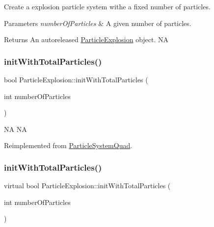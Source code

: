 Create a explosion particle system withe a fixed number of particles.


\begin{DoxyParams}{Parameters}
{\em number\+Of\+Particles} & A given number of particles. \\
\hline
\end{DoxyParams}
\begin{DoxyReturn}{Returns}
An autoreleased \hyperlink{classParticleExplosion}{Particle\+Explosion} object.  NA 
\end{DoxyReturn}
\mbox{\label{classParticleExplosion_a9f9b10a10eb9591beb51ac0fd150ab36}} 
\subsubsection{\texorpdfstring{init\+With\+Total\+Particles()}{initWithTotalParticles()}\hspace{0.1cm}{\footnotesize\ttfamily [1/2]}}
{\footnotesize\ttfamily bool Particle\+Explosion\+::init\+With\+Total\+Particles (\begin{DoxyParamCaption}\item[{int}]{number\+Of\+Particles }\end{DoxyParamCaption})\hspace{0.3cm}{\ttfamily [virtual]}}

NA  NA 

Reimplemented from \hyperlink{classParticleSystemQuad_ae5420007b57e909c05e7476a54fbfbe9}{Particle\+System\+Quad}.

\mbox{\label{classParticleExplosion_a0264fc392403902fb6077d711533bd19}} 
\subsubsection{\texorpdfstring{init\+With\+Total\+Particles()}{initWithTotalParticles()}\hspace{0.1cm}{\footnotesize\ttfamily [2/2]}}
{\footnotesize\ttfamily virtual bool Particle\+Explosion\+::init\+With\+Total\+Particles (\begin{DoxyParamCaption}\item[{int}]{number\+Of\+Particles }\end{DoxyParamCaption})\hspace{0.3cm}{\ttfamily [virtual]}}

